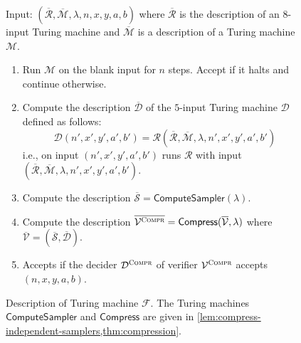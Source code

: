 \documentclass[11pt]{article}
\theoremstyle{definition}
\newcommand{\desc}[1]{\overline{\cal{#1}}}
\newcommand{\sampler}{\mathcal{S}}
\newcommand{\decider}{\mathcal{D}}
\newcommand{\verifier}{\mathcal{V}}
\newcommand{\compr}{\textsc{Compr}}
\renewcommand{\cal}[1]{\mathcal{#1}}
\newcommand{\tmstyle}[1]{\ensuremath{\mathsf{#1}}}
\newcommand{\Compress}{\tmstyle{Compress}}
\newcommand{\ComputeSampler}{\tmstyle{ComputeSampler}}
\newenvironment{gamespec}{
  \begin{mdframed}[style=figstyle]}{
  \end{mdframed}}
\begin{document}
\begin{figure}[!htp]
  \centering
  \begin{gamespec}
    Input: $(\desc{R}, \desc{M}, \lambda, n, x, y, a, b)$ where $\desc{R}$ is
    the description of an $8$-input Turing machine and $\desc{M}$ is a
    description of a Turing machine $\cal{M}$.

    \begin{enumerate}
    \item Run $\cal{M}$ on the blank input for $n$ steps.
      Accept if it halts and continue otherwise.
    \item Compute the description $\overline{\decider}$ of the $5$-input Turing
      machine $\decider$ defined as follows:
      \[
      	\decider(n',x',y',a',b') = \cal{R}(\desc{R}, \desc{M}, \lambda, n', x', y', a', b')
      \]
      i.e., on input $(n', x', y', a', b')$ runs $\cal{R}$ with
      input $(\desc{R}, \desc{M}, \lambda, n', x', y', a', b')$.
    \item Compute the description $\overline{\sampler} =
      \ComputeSampler(\lambda)$.
    \item Compute the description
      $\overline{\verifier^\compr} = \Compress(\overline{\verifier}, \lambda)$
      where $\overline{\verifier} = (\overline{\sampler}, \overline{\decider})$.
    \item Accepts if the decider $\decider^\compr$ of verifier
      $\verifier^\compr$ accepts $(n, x, y, a, b)$.
    \end{enumerate}
  \end{gamespec}
  \caption{Description of Turing machine $\cal{F}$.
    The Turing machines $\ComputeSampler$ and $\Compress$ are given in
    \cref{lem:compress-independent-samplers,thm:compression}.}
  \label{fig:halt_f}
\end{figure}
\end{document}
